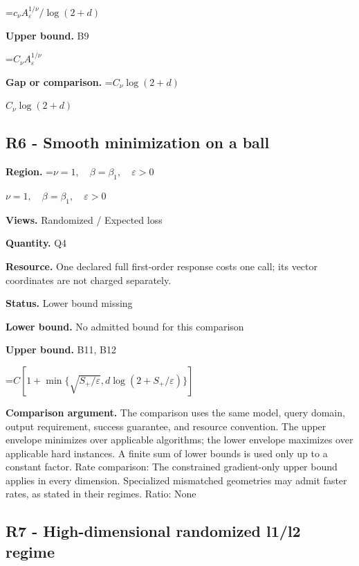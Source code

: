\documentclass[10pt,a4paper]{article}
\newcommand{\AtlasMath}[1]{\par\begingroup\centering\setbox0=\hbox{$\displaystyle #1$}\ifdim\wd0>1.4\linewidth\typeout{ATLAS WIDE FORMULA: \the\wd0}\fi\ifdim\wd0>\linewidth\resizebox{\linewidth}{!}{\box0}\else\box0\fi\par\endgroup}
\newcommand{\AtlasInlineMath}[1]{\begingroup\setbox0=\hbox{$#1$}\ifdim\wd0>.4\linewidth\endgroup\AtlasMath{#1}\else\endgroup$#1$\fi}
\begin{document}
\AtlasMath{c_\nu A_\varepsilon^{1/\nu}/\log(2+d)}


\textbf{Upper bound.} B9



\AtlasMath{C_\nu A_\varepsilon^{1/\nu}}


\textbf{Gap or comparison.} \AtlasInlineMath{C_\nu\log(2+d)}



\subsection{R6 - Smooth minimization on a ball}


\textbf{Region.} \AtlasInlineMath{\nu=1,\quad\beta=\beta_1,\quad\varepsilon>0}



\textbf{Views.} Randomized / Expected loss



\textbf{Quantity.} Q4



\textbf{Resource.} One declared full first-order response costs one call; its vector coordinates are not charged separately.



\textbf{Status.} Lower bound missing



\textbf{Lower bound.} No admitted bound for this comparison



\textbf{Upper bound.} B11, B12



\AtlasMath{C[1+\min\{\sqrt{S_+/\varepsilon},d\log(2+S_+/\varepsilon)\}]}


\textbf{Comparison argument.} The comparison uses the same model, query domain, output requirement, success guarantee, and resource convention. The upper envelope minimizes over applicable algorithms; the lower envelope maximizes over applicable hard instances. A finite sum of lower bounds is used only up to a constant factor. Rate comparison: The constrained gradient-only upper bound applies in every dimension. Specialized mismatched geometries may admit faster rates, as stated in their regimes. Ratio: None



\subsection{R7 - High-dimensional randomized l1/l2 regime}
\end{document}
